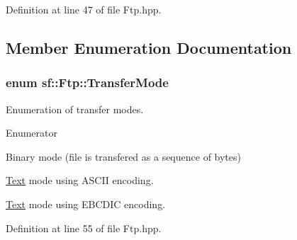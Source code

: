 Definition at line 47 of file Ftp.\-hpp.



\subsection{Member Enumeration Documentation}
\hypertarget{classsf_1_1_ftp_a1cd6b89ad23253f6d97e6d4ca4d558cb}{
\subsubsection[{Transfer\-Mode}]{\setlength{\rightskip}{0pt plus 5cm}enum {\bf sf\-::\-Ftp\-::\-Transfer\-Mode}}}\label{classsf_1_1_ftp_a1cd6b89ad23253f6d97e6d4ca4d558cb}


Enumeration of transfer modes. 

\begin{Desc}
\item[Enumerator]\par
\begin{description}
\item[{\em 
\hypertarget{classsf_1_1_ftp_a1cd6b89ad23253f6d97e6d4ca4d558cba6f253b362639fb5e059dc292762a21ee}{Binary}\label{classsf_1_1_ftp_a1cd6b89ad23253f6d97e6d4ca4d558cba6f253b362639fb5e059dc292762a21ee}
}]Binary mode (file is transfered as a sequence of bytes) \item[{\em 
\hypertarget{classsf_1_1_ftp_a1cd6b89ad23253f6d97e6d4ca4d558cbac9e544a22dce8ef3177449cb235d15c2}{Ascii}\label{classsf_1_1_ftp_a1cd6b89ad23253f6d97e6d4ca4d558cbac9e544a22dce8ef3177449cb235d15c2}
}]\hyperlink{classsf_1_1_text}{Text} mode using A\-S\-C\-I\-I encoding. \item[{\em 
\hypertarget{classsf_1_1_ftp_a1cd6b89ad23253f6d97e6d4ca4d558cbabb1e34435231e73c96534c71090be7f4}{Ebcdic}\label{classsf_1_1_ftp_a1cd6b89ad23253f6d97e6d4ca4d558cbabb1e34435231e73c96534c71090be7f4}
}]\hyperlink{classsf_1_1_text}{Text} mode using E\-B\-C\-D\-I\-C encoding. \end{description}
\end{Desc}


Definition at line 55 of file Ftp.\-hpp.



